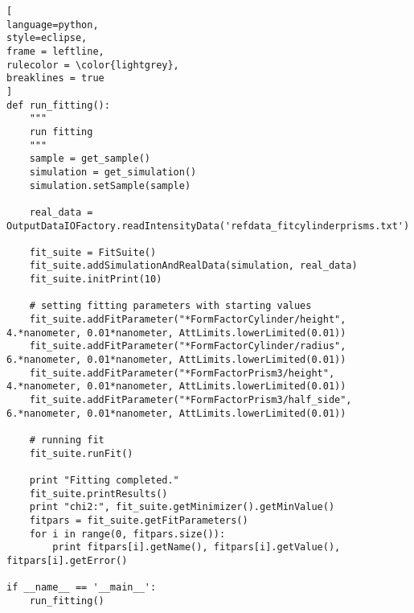 \begin{lstlisting}[
language=python, 
style=eclipse, 
frame = leftline, 
rulecolor = \color{lightgrey},
breaklines = true
]
def run_fitting():
    """
    run fitting
    """
    sample = get_sample()
    simulation = get_simulation()
    simulation.setSample(sample)

    real_data = OutputDataIOFactory.readIntensityData('refdata_fitcylinderprisms.txt')
    
    fit_suite = FitSuite()
    fit_suite.addSimulationAndRealData(simulation, real_data)
    fit_suite.initPrint(10)

    # setting fitting parameters with starting values
    fit_suite.addFitParameter("*FormFactorCylinder/height", 4.*nanometer, 0.01*nanometer, AttLimits.lowerLimited(0.01))
    fit_suite.addFitParameter("*FormFactorCylinder/radius", 6.*nanometer, 0.01*nanometer, AttLimits.lowerLimited(0.01))
    fit_suite.addFitParameter("*FormFactorPrism3/height", 4.*nanometer, 0.01*nanometer, AttLimits.lowerLimited(0.01))
    fit_suite.addFitParameter("*FormFactorPrism3/half_side", 6.*nanometer, 0.01*nanometer, AttLimits.lowerLimited(0.01))

    # running fit
    fit_suite.runFit()
    
    print "Fitting completed."
    fit_suite.printResults()
    print "chi2:", fit_suite.getMinimizer().getMinValue()
    fitpars = fit_suite.getFitParameters()
    for i in range(0, fitpars.size()):
        print fitpars[i].getName(), fitpars[i].getValue(), fitpars[i].getError()

if __name__ == '__main__':
    run_fitting()
\end{lstlisting}

